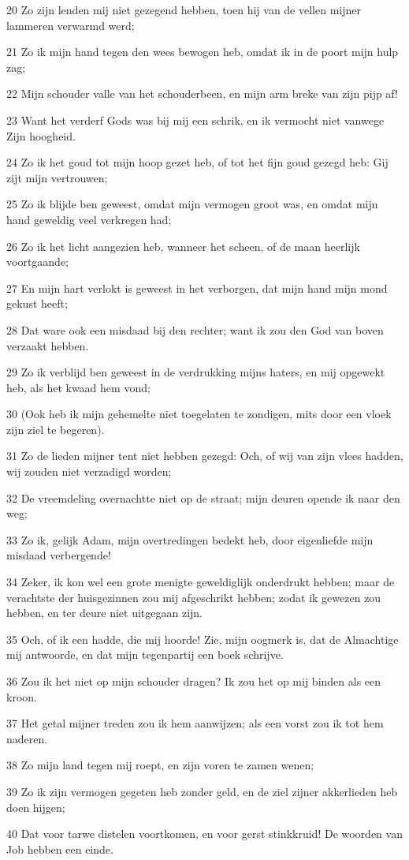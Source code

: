 \par 20 Zo zijn lenden mij niet gezegend hebben, toen hij van de vellen mijner lammeren verwarmd werd;
\par 21 Zo ik mijn hand tegen den wees bewogen heb, omdat ik in de poort mijn hulp zag;
\par 22 Mijn schouder valle van het schouderbeen, en mijn arm breke van zijn pijp af!
\par 23 Want het verderf Gods was bij mij een schrik, en ik vermocht niet vanwege Zijn hoogheid.
\par 24 Zo ik het goud tot mijn hoop gezet heb, of tot het fijn goud gezegd heb: Gij zijt mijn vertrouwen;
\par 25 Zo ik blijde ben geweest, omdat mijn vermogen groot was, en omdat mijn hand geweldig veel verkregen had;
\par 26 Zo ik het licht aangezien heb, wanneer het scheen, of de maan heerlijk voortgaande;
\par 27 En mijn hart verlokt is geweest in het verborgen, dat mijn hand mijn mond gekust heeft;
\par 28 Dat ware ook een misdaad bij den rechter; want ik zou den God van boven verzaakt hebben.
\par 29 Zo ik verblijd ben geweest in de verdrukking mijns haters, en mij opgewekt heb, als het kwaad hem vond;
\par 30 (Ook heb ik mijn gehemelte niet toegelaten te zondigen, mits door een vloek zijn ziel te begeren).
\par 31 Zo de lieden mijner tent niet hebben gezegd: Och, of wij van zijn vlees hadden, wij zouden niet verzadigd worden;
\par 32 De vreemdeling overnachtte niet op de straat; mijn deuren opende ik naar den weg;
\par 33 Zo ik, gelijk Adam, mijn overtredingen bedekt heb, door eigenliefde mijn misdaad verbergende!
\par 34 Zeker, ik kon wel een grote menigte geweldiglijk onderdrukt hebben; maar de verachtste der huisgezinnen zou mij afgeschrikt hebben; zodat ik gewezen zou hebben, en ter deure niet uitgegaan zijn.
\par 35 Och, of ik een hadde, die mij hoorde! Zie, mijn oogmerk is, dat de Almachtige mij antwoorde, en dat mijn tegenpartij een boek schrijve.
\par 36 Zou ik het niet op mijn schouder dragen? Ik zou het op mij binden als een kroon.
\par 37 Het getal mijner treden zou ik hem aanwijzen; als een vorst zou ik tot hem naderen.
\par 38 Zo mijn land tegen mij roept, en zijn voren te zamen wenen;
\par 39 Zo ik zijn vermogen gegeten heb zonder geld, en de ziel zijner akkerlieden heb doen hijgen;
\par 40 Dat voor tarwe distelen voortkomen, en voor gerst stinkkruid! De woorden van Job hebben een einde.

